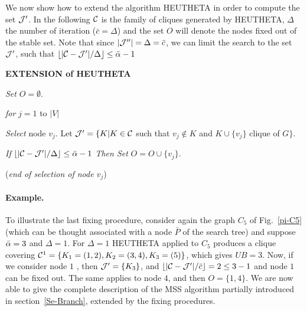 We now show how to extend the algorithm HEUTHETA in order to
compute the set ${\cal J'}$. In the following $\cal C$ is the
family of cliques generated by HEUTHETA, $\Delta$ the number of
iteration ($\bar c = \Delta$) and the set  $O$ will denote the nodes
fixed out of the stable set. Note that since $|{\cal J''}| = \Delta =
\bar c$, we can limit the search to the set ${\cal J'}$, such that  
$\lfloor|{\cal C}-{\cal J'}|/\Delta\rfloor\leq{\bar \alpha}-1$
 \begin{description}
   \item{\bf EXTENSION of  HEUTHETA}    
   \begin{description}
       \item {\it Set} $O = \emptyset$.
       \item {\it for} $j=1$ to $|V|$ 
       \begin{description}  
          \item {\it Select} node $v_j$.  
               Let ${\cal J}' = \{K|K \in {\cal C}$ such that
                   $v_j \notin K$ and 
                   $K \cup \{v_j\}$ clique of $G \}$. 
          \item {\it If} $\lfloor|{\cal C}-{\cal
                          J'}|/\Delta\rfloor\leq{\bar \alpha}-1$
                       {\it Then Set} $O = O \cup \{v_j\}$. 
       \end{description}
      \item ({\it end of selection of node $v_j$})
     \end{description}
 \end{description}

\paragraph{Example.}  To illustrate the last fixing procedure,
consider again the graph $C_5$ of  Fig.~\ref{pi-C5} (which can be
thought associated with a node $\bar P$ of the search tree) and
suppose ${\bar \alpha} = 3$ and $\Delta = 1$. For $\Delta = 1$  HEUTHETA
 applied to $C_5$ produces a clique covering 
${\cal C}^1 = \{K_1=(1,2) , K_2=(3,4) , K_3=(5) \}$, which gives $UB
= 3$. Now, if we consider node $1$ , then ${\cal J}'=\{K_3\}$, and
$\lfloor|{\cal C}-{\cal J}'|/\bar c\rfloor=2\leq 3-1$ and node $1$
can be fixed out. The same applies to node $4$, and then $O =
\{1,4\}$. We are now able to give the complete description of the
MSS algorithm partially introduced in section~\ref{Se-Branch},
extended by the fixing procedures.

